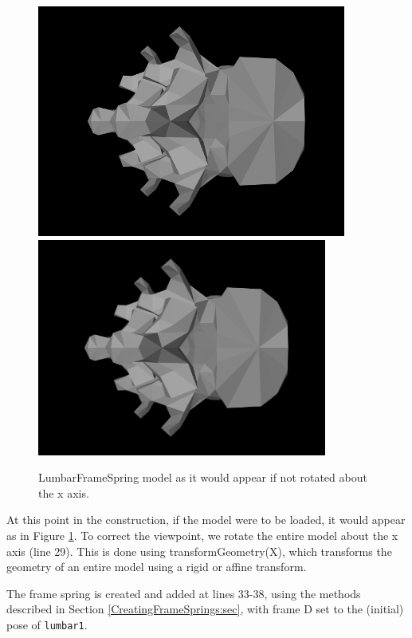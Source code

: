\begin{figure}[h]
\begin{center}
\iflatexml
 \includegraphics[]{images/LumbarFrameSpringNoflip}
\else
 \includegraphics[width=3.75in]{images/LumbarFrameSpringNoflip}
\fi
\end{center}
\caption{LumbarFrameSpring model as it would appear if not rotated
about the x axis.}
\label{LumbarFrameSpringNoflip:fig}
\end{figure}

At this point in the construction, if the model were to be loaded, it
would appear as in Figure \ref{LumbarFrameSpringNoflip:fig}. To
correct the viewpoint, we rotate the entire model about the x axis
(line 29).  This is done using
{transformGeometry(X)}, which transforms the geometry of an entire
model using a rigid or affine transform.

The frame spring is created and added at lines 33-38, using the
methods described in Section \ref{CreatingFrameSprings:sec}, with
frame D set to the (initial) pose of {\tt lumbar1}.

